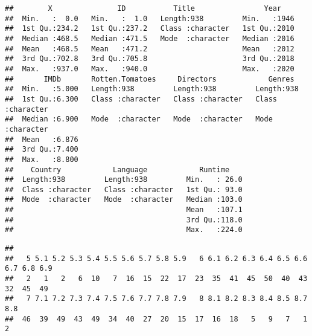 \documentclass[
]{article}
\newenvironment{Shaded}{\begin{snugshade}}{\end{snugshade}}
\newcommand{\FunctionTok}[1]{\textcolor[rgb]{0.00,0.00,0.00}{#1}}
\newcommand{\NormalTok}[1]{#1}
\newcommand{\SpecialCharTok}[1]{\textcolor[rgb]{0.00,0.00,0.00}{#1}}
\begin{document}
\begin{verbatim}
##        X               ID           Title                Year     
##  Min.   :  0.0   Min.   :  1.0   Length:938         Min.   :1946  
##  1st Qu.:234.2   1st Qu.:237.2   Class :character   1st Qu.:2010  
##  Median :468.5   Median :471.5   Mode  :character   Median :2016  
##  Mean   :468.5   Mean   :471.2                      Mean   :2012  
##  3rd Qu.:702.8   3rd Qu.:705.8                      3rd Qu.:2018  
##  Max.   :937.0   Max.   :940.0                      Max.   :2020  
##       IMDb       Rotten.Tomatoes     Directors            Genres         
##  Min.   :5.000   Length:938         Length:938         Length:938        
##  1st Qu.:6.300   Class :character   Class :character   Class :character  
##  Median :6.900   Mode  :character   Mode  :character   Mode  :character  
##  Mean   :6.876                                                           
##  3rd Qu.:7.400                                                           
##  Max.   :8.800                                                           
##    Country            Language            Runtime     
##  Length:938         Length:938         Min.   : 26.0  
##  Class :character   Class :character   1st Qu.: 93.0  
##  Mode  :character   Mode  :character   Median :103.0  
##                                        Mean   :107.1  
##                                        3rd Qu.:118.0  
##                                        Max.   :224.0
\end{verbatim}

\begin{Shaded}
\end{Shaded}

\begin{verbatim}
## 
##   5 5.1 5.2 5.3 5.4 5.5 5.6 5.7 5.8 5.9   6 6.1 6.2 6.3 6.4 6.5 6.6 6.7 6.8 6.9 
##   2   1   2   6  10   7  16  15  22  17  23  35  41  45  50  40  43  32  45  49 
##   7 7.1 7.2 7.3 7.4 7.5 7.6 7.7 7.8 7.9   8 8.1 8.2 8.3 8.4 8.5 8.7 8.8 
##  46  39  49  43  49  34  40  27  20  15  17  16  18   5   9   7   1   2
\end{verbatim}

\begin{Shaded}
\end{Shaded}
\end{document}
